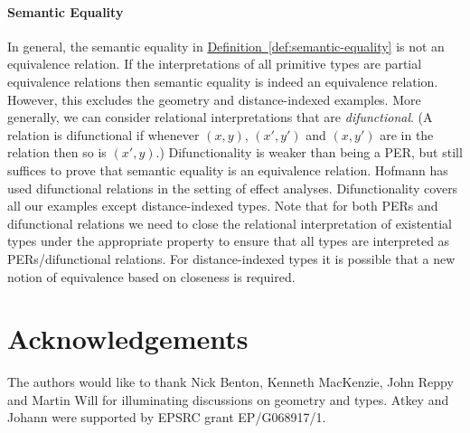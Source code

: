 \documentclass{sigplanconf}
\newcommand{\defref}[1]{\hyperref[#1]{Definition~\ref*{#1}}}
\theoremstyle{examplestyle}
\theoremstyle{restatementstyle}
\begin{document}
\paragraph{Semantic Equality} In general, the semantic equality
in \defref{def:semantic-equality} is not an
equivalence relation. If the interpretations of all 
primitive types are partial equivalence relations then semantic
equality is indeed an equivalence relation. However, this excludes the
geometry and distance-indexed examples. More generally, we can
consider relational interpretations that are \emph{difunctional}. (A
relation is difunctional if whenever $(x,y)$, $(x',y')$ and $(x,y')$
are in the relation then so is $(x',y)$.) Difunctionality is weaker
than being a PER, but still suffices to prove that semantic equality
is an equivalence relation. Hofmann \cite{hofmann08correctness} has
used difunctional relations in the setting of effect
analyses. Difunctionality covers all our examples except
distance-indexed types. Note that for both PERs and difunctional
relations we need to close the relational interpretation of
existential types under the appropriate property to ensure that all
types are interpreted as PERs/difunctional relations. For
distance-indexed types it is possible that a new notion of
equivalence based on closeness is required.



\section*{Acknowledgements}
The authors would like to thank Nick Benton, Kenneth MacKenzie, John
Reppy and Martin Will for illuminating discussions on geometry and
types. Atkey and Johann were supported by EPSRC grant EP/G068917/1.
\end{document}
